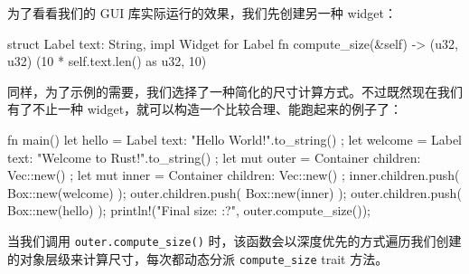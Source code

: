 为了看看我们的 GUI 库实际运行的效果，我们先创建另一种 widget：
\begin{codebox}[rust]
struct Label {
      text: String,
}
impl Widget for Label {
      fn compute_size(&self) -> (u32, u32) {
            (10 * self.text.len() as u32, 10)
      }
}
\end{codebox}
\label{idx:idx_78f324ad}
同样，为了示例的需要，我们选择了一种简化的尺寸计算方式。不过既然现在我们有了不止一种 widget，就可以构造一个比较合理、能跑起来的例子了：
\begin{codebox}[rust]
fn main() {
      let hello = Label { text: "Hello World!".to_string() };
      let welcome = Label { text: "Welcome to Rust!".to_string() };
      let mut outer = Container { children: Vec::new() };
      let mut inner = Container { children: Vec::new() };
      inner.children.push( Box::new(welcome) );
      outer.children.push( Box::new(inner) );
      outer.children.push( Box::new(hello) );
      println!("Final size: {:?}", outer.compute_size());
}
\end{codebox}
当我们调用 \texttt{outer.\allowbreak{}compute\_\allowbreak{}size(\allowbreak{})\allowbreak{}} 时，该函数会以深度优先的方式遍历我们创建的对象层级来计算尺寸，每次都动态分派 \texttt{compute\_\allowbreak{}size} trait 方法。
